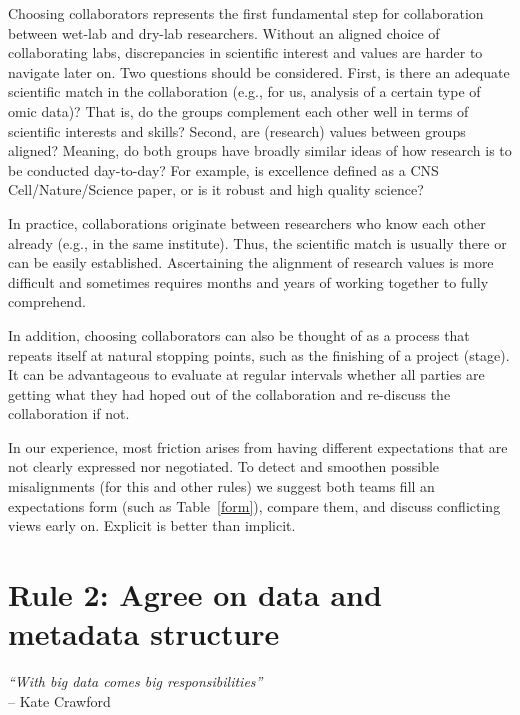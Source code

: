 \documentclass{article}
\begin{document}
Choosing collaborators represents the first fundamental step for collaboration between wet-lab and dry-lab researchers. Without an aligned choice of collaborating labs, discrepancies in scientific interest and values are harder to navigate later on. Two questions should be considered. First, is there an adequate scientific match in the collaboration (e.g., for us, analysis of a certain type of omic data)? That is, do the groups complement each other well in terms of scientific interests and skills? Second, are (research) values between groups aligned? Meaning, do both groups have broadly similar ideas of how research is to be conducted day-to-day? For example, is excellence defined as a CNS {\color{red} Cell/Nature/Science} paper, or is it robust and high quality science?

In practice, collaborations originate between researchers who know each other already (e.g., in the same institute). Thus, the scientific match is usually there or can be easily established. Ascertaining the alignment of research values is more difficult and sometimes requires months and years of working together to fully comprehend. 

In addition, choosing collaborators can also be thought of as a process that repeats itself at natural stopping points, such as the finishing of a project (stage). It can be advantageous to evaluate at regular intervals whether all parties are getting what they had hoped out of the collaboration and re-discuss the collaboration if not.

In our experience, most friction arises from having different expectations that are not clearly expressed nor negotiated. To detect and smoothen possible misalignments (for this and other rules) we suggest both teams fill an expectations form (such as Table~\ref{form}), compare them, and discuss conflicting views early on. Explicit is better than implicit. 

\section*{Rule 2: Agree on data and metadata structure} %
\label{rule2_data}

\begin{flushright}
\rightskip=1cm\textit{``With big data comes big responsibilities''} \\
\vspace{.2em}
\rightskip=0cm -- Kate Crawford
\end{flushright}
\end{document}
